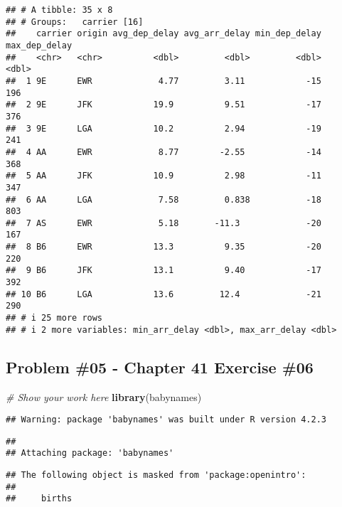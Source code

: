 \documentclass[
]{article}
\newenvironment{Shaded}{\begin{snugshade}}{\end{snugshade}}
\newcommand{\CommentTok}[1]{\textcolor[rgb]{0.56,0.35,0.01}{\textit{#1}}}
\newcommand{\FunctionTok}[1]{\textcolor[rgb]{0.13,0.29,0.53}{\textbf{#1}}}
\newcommand{\NormalTok}[1]{#1}
\begin{document}
\begin{verbatim}
## # A tibble: 35 x 8
## # Groups:   carrier [16]
##    carrier origin avg_dep_delay avg_arr_delay min_dep_delay max_dep_delay
##    <chr>   <chr>          <dbl>         <dbl>         <dbl>         <dbl>
##  1 9E      EWR             4.77         3.11            -15           196
##  2 9E      JFK            19.9          9.51            -17           376
##  3 9E      LGA            10.2          2.94            -19           241
##  4 AA      EWR             8.77        -2.55            -14           368
##  5 AA      JFK            10.9          2.98            -11           347
##  6 AA      LGA             7.58         0.838           -18           803
##  7 AS      EWR             5.18       -11.3             -20           167
##  8 B6      EWR            13.3          9.35            -20           220
##  9 B6      JFK            13.1          9.40            -17           392
## 10 B6      LGA            13.6         12.4             -21           290
## # i 25 more rows
## # i 2 more variables: min_arr_delay <dbl>, max_arr_delay <dbl>
\end{verbatim}

\newpage

\hypertarget{problem-05---chapter-41-exercise-06}{%
\subsection{Problem \#05 - Chapter 41 Exercise
\#06}\label{problem-05---chapter-41-exercise-06}}

\begin{Shaded}
\begin{Highlighting}[]
\CommentTok{\# Show your work here}
\FunctionTok{library}\NormalTok{(babynames)}
\end{Highlighting}
\end{Shaded}

\begin{verbatim}
## Warning: package 'babynames' was built under R version 4.2.3
\end{verbatim}

\begin{verbatim}
## 
## Attaching package: 'babynames'
\end{verbatim}

\begin{verbatim}
## The following object is masked from 'package:openintro':
## 
##     births
\end{verbatim}
\end{document}
